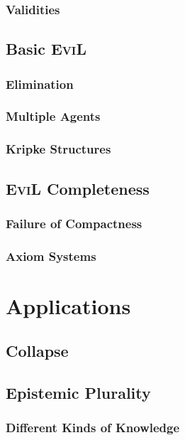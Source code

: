 \documentclass[11pt]{article}
\numberwithin{equation}{subsection}
\begin{document}
\subsubsection{Validities}
\label{validities}

\subsection{Basic \textsc{EviL}}
\label{dead-by-dawn}
\subsubsection{Elimination}
\label{elimination}

\subsubsection{Multiple Agents}\label{multi-agent}

\subsubsection{Kripke Structures}\label{kripke}

\subsection{\textsc{EviL} Completeness}\label{army-of-darkness}
\subsubsection{Failure of Compactness}
\label{non-compactness}

\subsubsection{Axiom Systems}\label{evil-axioms}



\section{Applications}\label{applications}
\subsection{Collapse}
\subsection{Epistemic Plurality}
\subsubsection{Different Kinds of Knowledge}
\end{document}
